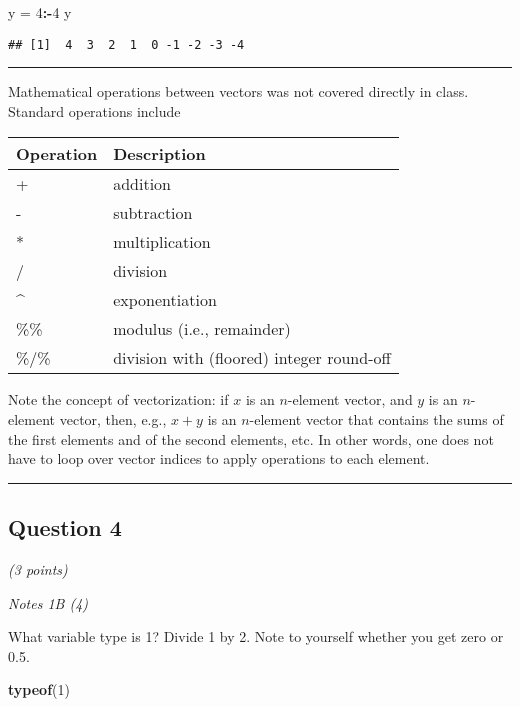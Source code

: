 \documentclass[
]{article}
\newenvironment{Shaded}{\begin{snugshade}}{\end{snugshade}}
\newcommand{\DecValTok}[1]{\textcolor[rgb]{0.00,0.00,0.81}{#1}}
\newcommand{\KeywordTok}[1]{\textcolor[rgb]{0.13,0.29,0.53}{\textbf{#1}}}
\newcommand{\NormalTok}[1]{#1}
\newcommand{\OperatorTok}[1]{\textcolor[rgb]{0.81,0.36,0.00}{\textbf{#1}}}
\newcommand{\StringTok}[1]{\textcolor[rgb]{0.31,0.60,0.02}{#1}}
\begin{document}
\begin{Shaded}
\begin{Highlighting}[]
\NormalTok{y =}\StringTok{ }\DecValTok{4}\OperatorTok{:-}\DecValTok{4}
\NormalTok{y}
\end{Highlighting}
\end{Shaded}

\begin{verbatim}
## [1]  4  3  2  1  0 -1 -2 -3 -4
\end{verbatim}

\begin{center}\rule{0.5\linewidth}{0.5pt}\end{center}

Mathematical operations between vectors was not covered directly in
class. Standard operations include

\begin{longtable}[]{@{}ll@{}}
\toprule
Operation & Description\tabularnewline
\midrule
\endhead
+ & addition\tabularnewline
- & subtraction\tabularnewline
* & multiplication\tabularnewline
/ & division\tabularnewline
\^{} & exponentiation\tabularnewline
\%\% & modulus (i.e., remainder)\tabularnewline
\%/\% & division with (floored) integer round-off\tabularnewline
\bottomrule
\end{longtable}

Note the concept of vectorization: if \(x\) is an \(n\)-element vector,
and \(y\) is an \(n\)-element vector, then, e.g., \(x+y\) is an
\(n\)-element vector that contains the sums of the first elements and of
the second elements, etc. In other words, one does not have to loop over
vector indices to apply operations to each element.

\begin{center}\rule{0.5\linewidth}{0.5pt}\end{center}

\hypertarget{question-4}{%
\subsection{Question 4}\label{question-4}}

\emph{(3 points)}

\emph{Notes 1B (4)}

What variable type is 1? Divide 1 by 2. Note to yourself whether you get
zero or 0.5.

\begin{Shaded}
\begin{Highlighting}[]
\KeywordTok{typeof}\NormalTok{(}\DecValTok{1}\NormalTok{)}
\end{Highlighting}
\end{Shaded}
\end{document}
